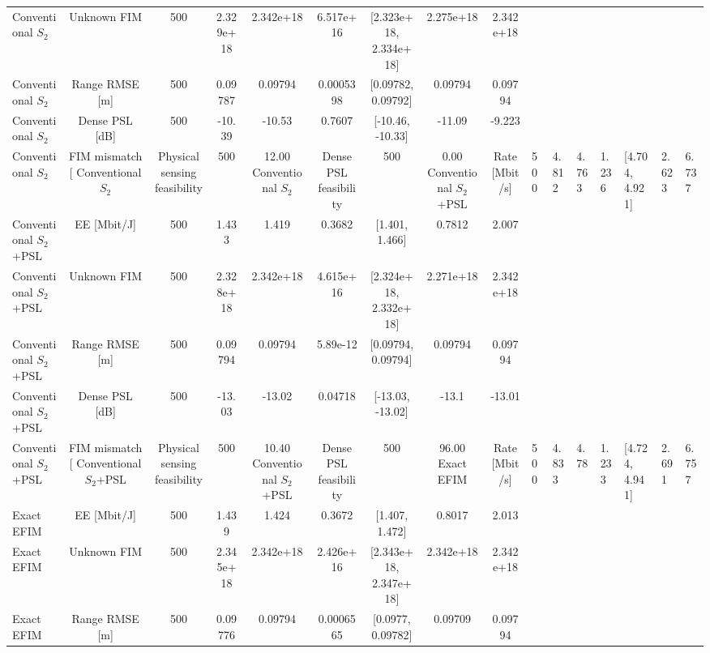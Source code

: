 \begin{table}[t]
\begin{tabular}{lcccccccc}
Conventional $S_2$ & Unknown FIM & 500 & 2.329e+18 & 2.342e+18 & 6.517e+16 & [2.323e+18, 2.334e+18] & 2.275e+18 & 2.342e+18 \\
Conventional $S_2$ & Range RMSE [m] & 500 & 0.09787 & 0.09794 & 0.0005398 & [0.09782, 0.09792] & 0.09794 & 0.09794 \\
Conventional $S_2$ & Dense PSL [dB] & 500 & -10.39 & -10.53 & 0.7607 & [-10.46, -10.33] & -11.09 & -9.223 \\
Conventional $S_2$ & FIM mismatch [%
Conventional $S_2$ & Physical sensing feasibility & 500 & 12.00%
Conventional $S_2$ & Dense PSL feasibility & 500 & 0.00%
Conventional $S_2$+PSL & Rate [Mbit/s] & 500 & 4.812 & 4.763 & 1.236 & [4.704, 4.921] & 2.623 & 6.737 \\
Conventional $S_2$+PSL & EE [Mbit/J] & 500 & 1.433 & 1.419 & 0.3682 & [1.401, 1.466] & 0.7812 & 2.007 \\
Conventional $S_2$+PSL & Unknown FIM & 500 & 2.328e+18 & 2.342e+18 & 4.615e+16 & [2.324e+18, 2.332e+18] & 2.271e+18 & 2.342e+18 \\
Conventional $S_2$+PSL & Range RMSE [m] & 500 & 0.09794 & 0.09794 & 5.89e-12 & [0.09794, 0.09794] & 0.09794 & 0.09794 \\
Conventional $S_2$+PSL & Dense PSL [dB] & 500 & -13.03 & -13.02 & 0.04718 & [-13.03, -13.02] & -13.1 & -13.01 \\
Conventional $S_2$+PSL & FIM mismatch [%
Conventional $S_2$+PSL & Physical sensing feasibility & 500 & 10.40%
Conventional $S_2$+PSL & Dense PSL feasibility & 500 & 96.00%
Exact EFIM & Rate [Mbit/s] & 500 & 4.833 & 4.78 & 1.233 & [4.724, 4.941] & 2.691 & 6.757 \\
Exact EFIM & EE [Mbit/J] & 500 & 1.439 & 1.424 & 0.3672 & [1.407, 1.472] & 0.8017 & 2.013 \\
Exact EFIM & Unknown FIM & 500 & 2.345e+18 & 2.342e+18 & 2.426e+16 & [2.343e+18, 2.347e+18] & 2.342e+18 & 2.342e+18 \\
Exact EFIM & Range RMSE [m] & 500 & 0.09776 & 0.09794 & 0.0006565 & [0.0977, 0.09782] & 0.09709 & 0.09794 \\

\end{tabular}
\end{table}
